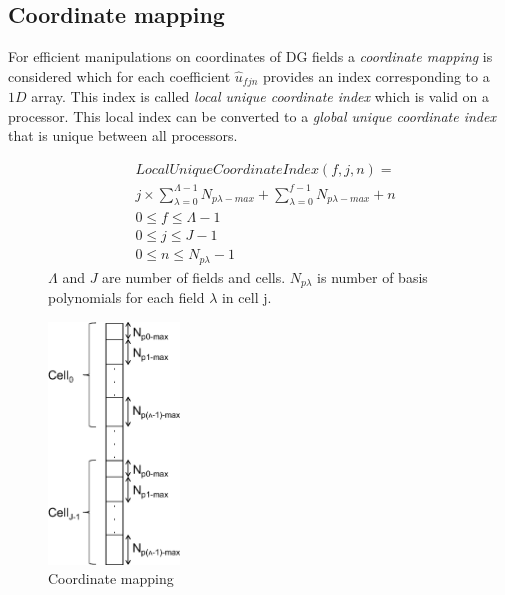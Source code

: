 \documentclass[BoSSSForSolvingConservationLaws.tex]{subfiles}
\begin{document}
\subsection{Coordinate mapping}
\label{sec:CoordinateMapping}
For efficient manipulations on coordinates of DG fields a \emph{coordinate mapping} is considered which for each coefficient $\hat{u}_{fjn}$ provides an index corresponding to a $1D$ array. This index is called \emph{local unique coordinate index} which is valid on a processor. This local index can be converted to a \emph{global unique coordinate index} that is unique between all processors.
\begin{figure}[h]
\begin{minipage}{0.49\textwidth}
\begin{align*}
&LocalUniqueCoordinateIndex(f,j,n)=\\&j \times \sum_{\lambda=0}^{\Lambda-1} N_{p\lambda-max}+\sum_{\lambda=0}^{f-1}N_{p\lambda-max}+n\\
&0 \le f \le \Lambda-1\\
&0\le j\le J-1\\
&0\le n\le N_{p\lambda} -1
\end{align*}
$\Lambda$ and $J$ are number of fields and cells. $N_{p\lambda}$ is number of basis polynomials for each field $\lambda$ in cell j.
\end{minipage}
\begin{minipage}{0.49\textwidth}
  \begin{center}
  \includegraphics[width=3.5cm]{Figures/CoordinateMapping}
  \end{center}
  \caption{Coordinate mapping}
  \label{fig:CoordinateMapping}
\end{minipage}
\end{figure}
\end{document}
